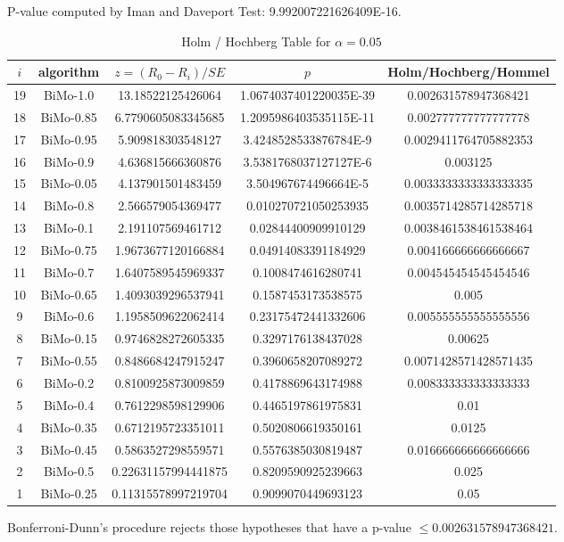 \documentclass[a4paper,10pt]{article}
\begin{document}
\begin{landscape}
P-value computed by Iman and Daveport Test: 9.992007221626409E-16.\newline

\begin{table}[!htp]
\centering\tiny
\caption{Holm / Hochberg Table for $\alpha=0.05$}
\begin{tabular}{ccccc}
$i$&algorithm&$z=(R_0 - R_i)/SE$&$p$&Holm/Hochberg/Hommel\\
\hline
19&BiMo-1.0&13.18522125426064&1.0674037401220035E-39&0.002631578947368421\\
18&BiMo-0.85&6.7790605083345685&1.2095986403535115E-11&0.002777777777777778\\
17&BiMo-0.95&5.909818303548127&3.4248528533876784E-9&0.0029411764705882353\\
16&BiMo-0.9&4.636815666360876&3.5381768037127127E-6&0.003125\\
15&BiMo-0.05&4.137901501483459&3.504967674496664E-5&0.0033333333333333335\\
14&BiMo-0.8&2.566579054369477&0.010270721050253935&0.0035714285714285718\\
13&BiMo-0.1&2.191107569461712&0.02844400909910129&0.0038461538461538464\\
12&BiMo-0.75&1.9673677120166884&0.04914083391184929&0.004166666666666667\\
11&BiMo-0.7&1.6407589545969337&0.1008474616280741&0.004545454545454546\\
10&BiMo-0.65&1.4093039296537941&0.1587453173538575&0.005\\
9&BiMo-0.6&1.1958509622062414&0.23175472441332606&0.005555555555555556\\
8&BiMo-0.15&0.9746828272605335&0.3297176138437028&0.00625\\
7&BiMo-0.55&0.8486684247915247&0.3960658207089272&0.0071428571428571435\\
6&BiMo-0.2&0.8100925873009859&0.4178869643174988&0.008333333333333333\\
5&BiMo-0.4&0.7612298598129906&0.4465197861975831&0.01\\
4&BiMo-0.35&0.6712195723351011&0.5020806619350161&0.0125\\
3&BiMo-0.45&0.5863527298559571&0.5576385030819487&0.016666666666666666\\
2&BiMo-0.5&0.22631157994441875&0.8209590925239663&0.025\\
1&BiMo-0.25&0.11315578997219704&0.9099070449693123&0.05\\
\hline
\end{tabular}
\end{table}
Bonferroni-Dunn's procedure rejects those hypotheses that have a p-value $\le0.002631578947368421$.



\end{landscape}
\end{document}
